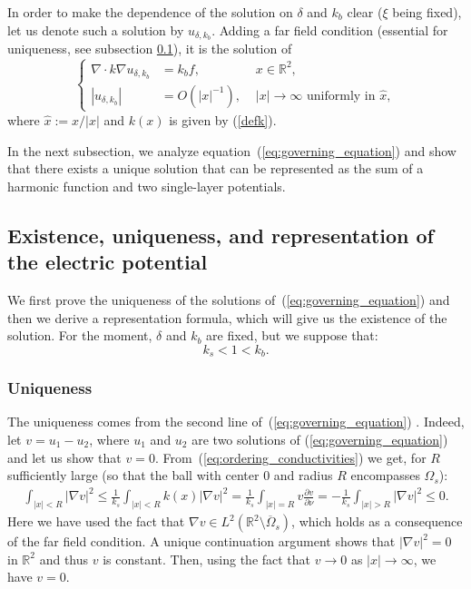 \documentclass[final]{siamltex}
\numberwithin{equation}{section}
\numberwithin{figure}{section}
\numberwithin{table}{section}
\begin{document}
In order to make the dependence of the solution on $\delta$ and
$k_b$ clear ($\xi$ being fixed), let us denote such a solution by
$u_{\delta,k_{b}}$. Adding a far field condition (essential for
uniqueness, see subsection \ref{sub:existence-uniqueness}), it is
the solution of
\begin{equation}
\left\{ \begin{alignedat}{2}\nabla\cdot k\nabla u_{\delta,k_{b}} & = k_b f, & \,\, x\in\mathbb{R}^{2},\\
\left|u_{\delta,k_{b}} \right| & = {O}(\left|x\right|^{-1}), &
\,\,\left|x\right|\rightarrow\infty \text{ uniformly in }\hat{x},
\end{alignedat}
\right.\label{eq:governing_equation}
\end{equation}
 where $\hat{x}:=x/\left|x\right|$ and $k(x)$ is given by
 (\ref{defk}).

 In the next subsection, we analyze
equation~(\ref{eq:governing_equation}) and show that there exists
a unique solution that can be represented as the sum of a harmonic
function and two single-layer potentials.

\subsection{Existence, uniqueness, and representation of the
electric potential} \label{sub:existence-uniqueness}

We first prove  the uniqueness of the solutions
of~(\ref{eq:governing_equation}) and then we derive a
representation formula, which will give us the existence of the
solution. For the moment, $\delta$ and $k_{b}$ are fixed, but we
suppose that:
\begin{equation}
k_{s} < 1 < k_{b}.\label{eq:ordering_conductivities}
\end{equation}



\subsubsection{Uniqueness}

The uniqueness comes from the second line
of~(\ref{eq:governing_equation}) \cite{ammari2007polarization}.
Indeed, let $v=u_1-u_2$, where $u_1$ and $u_2$ are two solutions
of (\ref{eq:governing_equation}) and let us show that $v=0$.
From~(\ref{eq:ordering_conductivities}) we get, for $R$
sufficiently large (so that the ball with center $0$ and radius
$R$ encompasses $\Omega_s$):
\begin{align*}
\int_{\left|x\right|<R}\left|\nabla v\right|^{2}
\leq\frac{1}{k_{s}} \int_{\left|x\right|<R} k(x) \left|\nabla
v\right|^{2} =
 \frac{1}{k_{s}}\int_{\left|x\right|=R}v\frac{\partial v}{\partial\nu}=
 -\frac{1}{k_{s}}\int_{\left|x\right|>R}\left|\nabla
v\right|^{2}\leq0.
\end{align*}
Here we have used the fact that  $\nabla v \in
L^2(\mathbb{R}^{2}\setminus \overline{\Omega}_s)$, which holds as
a consequence of the far field condition.
 A unique continuation argument shows that
$\left|\nabla v\right|^{2}=0$ in $\mathbb{R}^{2}$ and thus $v$ is
constant. Then, using the fact that $v\rightarrow0$ as
$|x|\rightarrow \infty$, we have $v=0$.
\end{document}
